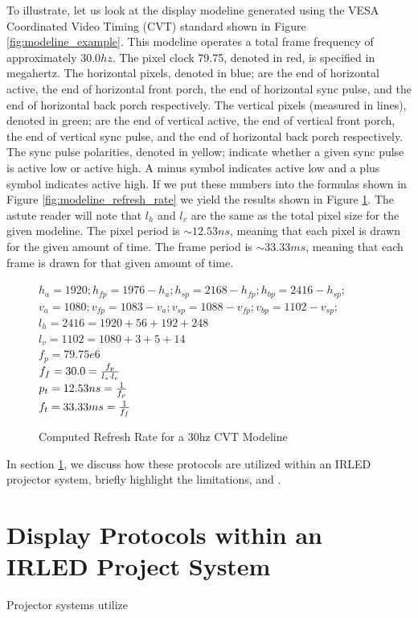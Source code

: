     To illustrate, let us look at the display modeline generated using the VESA Coordinated Video Timing (CVT) standard shown in Figure \ref{fig:modeline_example}. This modeline operates a total frame frequency of approximately $30.0hz$. The pixel clock 79.75, denoted in red, is specified in megahertz. The horizontal pixels, denoted in blue; are the end of horizontal active, the end of horizontal front porch, the end of horizontal sync pulse, and the end of horizontal back porch respectively. The vertical pixels (measured in lines), denoted in green; are the end of vertical active, the end of vertical front porch, the end of vertical sync pulse, and the end of horizontal back porch respectively. The sync pulse polarities, denoted in yellow; indicate whether a given sync pulse is active low or active high. A minus symbol indicates active low and a plus symbol indicates active high. If we put these numbers into the formulas shown in Figure \ref{fig:modeline_refresh_rate} we yield the results shown in Figure \ref{fig:modeline_refresh_rate_plug}. The astute reader will note that $l_h$ and $l_v$ are the same as the total pixel size for the given modeline. The pixel period is $\sim12.53ns$, meaning that each pixel is drawn for the given amount of time. The frame period is $\sim33.33ms$, meaning that each frame is drawn for that given amount of time.

    \begin{figure}
        \centering
        { \Large
            $h_a=1920; h_{fp}=1976-h_a; h_{sp}=2168-h_{fp}; h_{bp}=2416-h_{sp};$ \\
            $v_a=1080; v_{fp}=1083-v_a; v_{sp}=1088-v_{fp}; v_{bp}=1102-v_{sp};$ \\
            $l_h=2416=1920+56+192+248$ \vspace{8px} \\
            $l_v=1102=1080+3+5+14$ \vspace{8px} \\
            $f_p=79.75e6$ \vspace{8px} \\
            $f_f=30.0={f_p \over {l_s \cdot l_c}}$ \\
            $p_t=12.53ns={1 \over f_p}$ \vspace{8px} \\
            $f_t=33.33ms={1 \over f_f}$ \vspace{8px}
        }
        \caption{Computed Refresh Rate for a 30hz CVT Modeline}
        \label{fig:modeline_refresh_rate_plug}
    \end{figure}

    In section \ref{sec:displays_within_proj_system}, we discuss how these protocols are utilized within an IRLED projector system, briefly highlight the limitations, and . %

\section{Display Protocols within an IRLED Project System}
    \label{sec:displays_within_proj_system}
    Projector systems utilize
